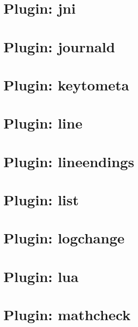 \documentclass[twoside]{book}
\newcommand{\+}{\discretionary{\mbox{\scriptsize$\hookleftarrow$}}{}{}}
\begin{document}
\chapter{Plugin\+: jni}
\label{md_src_plugins_jni_README}
\hypertarget{md_src_plugins_jni_README}{}

\chapter{Plugin\+: journald}
\label{md_src_plugins_journald_README}
\hypertarget{md_src_plugins_journald_README}{}

\chapter{Plugin\+: keytometa}
\label{md_src_plugins_keytometa_README}
\hypertarget{md_src_plugins_keytometa_README}{}

\chapter{Plugin\+: line}
\label{md_src_plugins_line_README}
\hypertarget{md_src_plugins_line_README}{}

\chapter{Plugin\+: lineendings}
\label{md_src_plugins_lineendings_README}
\hypertarget{md_src_plugins_lineendings_README}{}

\chapter{Plugin\+: list}
\label{md_src_plugins_list_README}
\hypertarget{md_src_plugins_list_README}{}

\chapter{Plugin\+: logchange}
\label{md_src_plugins_logchange_README}
\hypertarget{md_src_plugins_logchange_README}{}

\chapter{Plugin\+: lua}
\label{md_src_plugins_lua_README}
\hypertarget{md_src_plugins_lua_README}{}

\chapter{Plugin\+: mathcheck}
\label{md_src_plugins_mathcheck_README}
\hypertarget{md_src_plugins_mathcheck_README}{}

\end{document}
